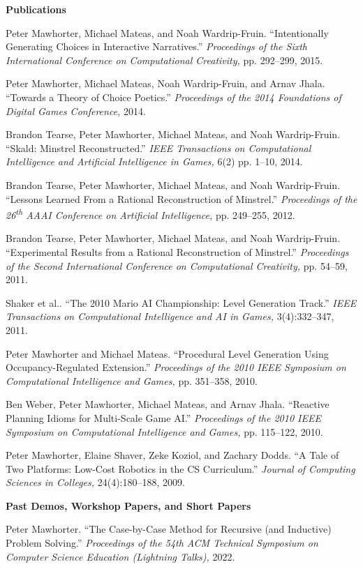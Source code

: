\documentclass[11pt]{article}
\newenvironment{pubs}[1]{%
  \vspace{8pt}\textbf{\Large #1} \hrulefill\vspace{6pt}
  \begin{adjustwidth}{14pt}{0pt}
  \setlength{\parskip}{4pt}
  \setlength{\parindent}{-8pt}
}{%
  \end{adjustwidth}
}
\newcommand{\fullpub}[5]{%
\begin{samepage}
#1. ``#2.'' \textit{#3,} #4, #5.

\end{samepage}%
}
\newcommand{\nppub}[4]{%
\begin{samepage}
#1. ``#2.'' \textit{#3,} #4.

\end{samepage}%
}
\newcommand{\heading}[1]{\textbf{\large #1}\vspace{4pt}}
\newcommand{\tsup}[1]{\textsuperscript{#1}}
\begin{document}
\begin{pubs}{Publications}
\fullpub{Peter Mawhorter, Michael Mateas, and Noah Wardrip-Fruin}{Intentionally Generating Choices in Interactive Narratives}{Proceedings of the Sixth International Conference on Computational Creativity}{pp. 292--299}{2015}

\nppub{Peter Mawhorter, Michael Mateas, Noah Wardrip-Fruin, and Arnav Jhala}{Towards a Theory of Choice Poetics}{Proceedings of the 2014 Foundations of Digital Games Conference}{2014}

\fullpub{Brandon Tearse, Peter Mawhorter, Michael Mateas, and Noah Wardrip-Fruin}{Skald: Minstrel Reconstructed}{IEEE Transactions on Computational Intelligence and Artificial Intelligence in Games}{6(2) pp. 1--10}{2014}

\fullpub{Brandon Tearse, Peter Mawhorter, Michael Mateas, and Noah Wardrip-Fruin}{Lessons Learned From a Rational Reconstruction of Minstrel}{Proceedings of the 26\tsup{th} AAAI Conference on Artificial Intelligence}{pp. 249--255}{2012}

\fullpub{Brandon Tearse, Peter Mawhorter, Michael Mateas, and Noah Wardrip-Fruin}{Experimental Results from a Rational Reconstruction of Minstrel}{Proceedings of the Second International Conference on Computational Creativity}{pp. 54--59}{2011}

\fullpub{Shaker et al.}{The 2010 Mario AI Championship: Level Generation Track}{IEEE Transactions on Computational Intelligence and AI in Games}{3(4):332--347}{2011}

\fullpub{Peter Mawhorter and Michael Mateas}{Procedural Level Generation Using Occupancy-Regulated Extension}{Proceedings of the 2010 IEEE Symposium on Computational Intelligence and Games}{pp. 351--358}{2010}

\fullpub{Ben Weber, Peter Mawhorter, Michael Mateas, and Arnav Jhala}{Reactive Planning Idioms for Multi-Scale Game AI}{Proceedings of the 2010 IEEE Symposium on Computational Intelligence and Games}{pp. 115--122}{2010}

\fullpub{Peter Mawhorter, Elaine Shaver, Zeke Koziol, and Zachary Dodds}{A Tale of Two Platforms: Low-Cost Robotics in the CS Curriculum}{Journal of Computing Sciences in Colleges}{24(4):180--188}{2009}

\vspace{6pt}
\heading{Past Demos, Workshop Papers, and Short Papers}

\nppub{Peter Mawhorter}{The Case-by-Case Method for Recursive (and Inductive) Problem Solving}{Proceedings of the 54th ACM Technical Symposium on Computer Science Education (Lightning Talks)}{2022}


\end{pubs}
\end{document}
